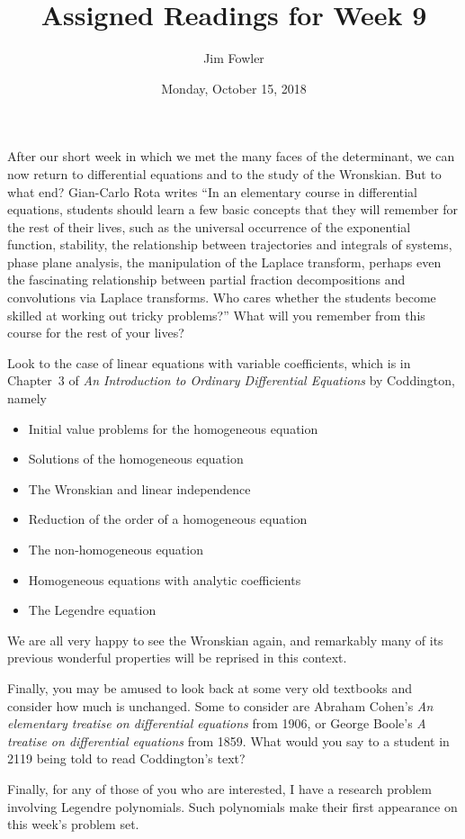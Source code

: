 \documentclass{homework}
\author{Jim Fowler}
\title{Assigned Readings for Week 9}
\date{Monday, October 15, 2018}
\begin{document}
\maketitle

After our short week in which we met the many faces of the
determinant, we can now return to differential equations and to the
study of the Wronskian.  But to what end?  Gian-Carlo Rota writes ``In
an elementary course in differential equations, students should learn
a few basic concepts that they will remember for the rest of their
lives, such as the universal occurrence of the exponential function,
stability, the relationship between trajectories and integrals of
systems, phase plane analysis, the manipulation of the Laplace
transform, perhaps even the fascinating relationship between partial
fraction decompositions and convolutions via Laplace transforms.  Who
cares whether the students become skilled at working out tricky
problems?''  What will you remember from this course for the rest of
your lives?

Look to the case of linear equations with variable coefficients, which
is in Chapter~3 of \textit{An Introduction to Ordinary Differential
  Equations} by Coddington, namely
\begin{itemize}
\item {} Initial value problems for the homogeneous equation
\item {} Solutions of the homogeneous equation %
\item {} The Wronskian and linear independence %
\item {} Reduction of the order of a homogeneous equation %
\item {} The non-homogeneous equation %
\item {} Homogeneous equations with analytic coefficients %
\item {} The Legendre equation %
\end{itemize}
We are all very happy to see the Wronskian again, and remarkably many
of its previous wonderful properties will be reprised in this context.

Finally, you may be amused to look back at some very old textbooks and
consider how much is unchanged.  Some to consider are Abraham Cohen's
\textit{An elementary treatise on differential equations} from 1906,
or George Boole's \textit{A treatise on differential equations} from
1859.  What would you say to a student in 2119 being told to read
Coddington's text?

Finally, for any of those of you who are interested, I have a research
problem involving Legendre polynomials.  Such polynomials make their
first appearance on this week's problem set.
\end{document}
